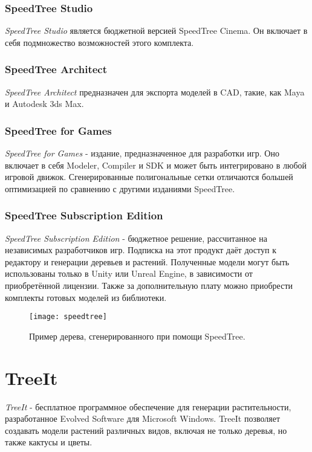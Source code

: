 \subsubsection{SpeedTree Studio}
\emph{SpeedTree Studio} является бюджетной версией SpeedTree Cinema. Он включает в себя подмножество возможностей этого комплекта.

\subsubsection{SpeedTree Architect}
\emph{SpeedTree Architect} предназначен для экспорта моделей в CAD, такие, как Maya и Autodesk 3ds Max.

\subsubsection{SpeedTree for Games}
\emph{SpeedTree for Games} - издание, предназначенное для разработки игр. Оно включает в себя Modeler, Compiler и SDK и может быть интегрировано в любой игровой движок. Сгенерированные полигональные сетки отличаются большей оптимизацией по сравнению с другими изданиями SpeedTree.

\subsubsection{SpeedTree Subscription Edition}
\emph{SpeedTree Subscription Edition} - бюджетное решение, рассчитанное на независимых разработчиков игр. Подписка на этот продукт даёт доступ к редактору и генерации деревьев и растений. Полученные модели могут быть использованы только в Unity или Unreal Engine, в зависимости от приобретённой лицензии. Также за дополнительную плату можно приобрести комплекты готовых моделей из библиотеки.

\begin{figure}[h]
    \centering
    \texttt{[image: speedtree]}
    \caption{Пример дерева, сгенерированного при помощи SpeedTree.}
    \label{fig:speedtree}
\end{figure}

\section{TreeIt}
\emph{TreeIt} - бесплатное программное обеспечение для генерации растительности, разработанное Evolved Software для Microsoft Windows. TreeIt позволяет создавать модели растений различных видов, включая не только деревья, но также кактусы и цветы.


